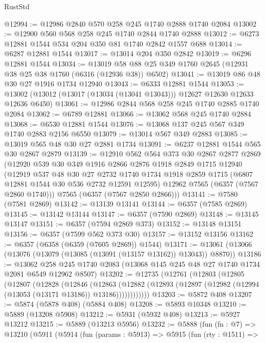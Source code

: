 \begin{lexlean}{RustStd}
\begin{coremodule}
@12994 := @12986 @2840 @570 @258 @245 @1740 @2888 @1740 @2084
@13002 := @12900 @560 @568 @258 @245 @1740 @2844 @1740 @2888
@13012 := @6273 @12881 @1544 @534 @204 @350 @81 @1740 @2842 @1557 @688
@13014 := @6287 @12881 @1544
@13017 := @13014 @204 @350 @2842
@13019 := @6296 @12881 @1544
@13034 := @13019 @58 @88 @25 @349 @1760 @2645 (@12931 @38 @25 @38 @1760 (@6316 (@12936 @38)) @6502)
@13041 := @13019 @86 @48 @30 @27 @1916 @1734 @12940
@13043 := @6333 @12881 @1544
@13053 := @13002 (@13012 (@13017 (@13034 (@13041 @13043))) @12627 @12630 @12633 @12636 @6450)
@13061 := @12986 @2844 @568 @258 @245 @1740 @2885 @1740 @2084
@13062 := @6789 @12881
@13066 := @13062 @568 @245 @1740 @2884
@13068 := @6530 @12881 @1544
@13076 := @13068 @137 @245 @567 @349 @1740 @2883 @2156 @6550
@13079 := @13014 @567 @349 @2883
@13085 := @13019 @565 @48 @30 @27 @2881 @1734
@13091 := @6237 @12881 @1544 @565 @30 @2867 @2879
@13139 := @12910
    @562
    @564
    @373
    @30
    @2867
    @2877
    @2869
    (@12920
      @539
      @30
      @349
      @1916
      @2866
      @2876
      @1918
      @2849
      @1715
      @12940
      (@12919
        @537
        @48
        @30
        @27
        @2732
        @1740
        @1734
        @1918
        @2859
        @1715
        (@6807 @12881 @1544 @30 @536 @2732 @12591 @12595)
        @12962
        @7565
        (@6357 (@7567 @2860 @1740)))
      @7565
      (@6357 (@7567 @2850 @2866)))
@13141 := @7580 (@7581 @2869)
@13142 := @13139 @13141
@13144 := @6357 (@7585 @2869)
@13145 := @13142 @13144
@13147 := @6357 (@7590 @2869)
@13148 := @13145 @13147
@13151 := @6357 (@7594 @2869 @373)
@13152 := @13148 @13151
@13156 := @6357 (@7599 @562 @373 @30)
@13157 := @13152 @13156
@13162 := @6357 (@6358 (@6359 (@7605 @2869)) @1544)
@13171 := @13061 (@13066 (@13076 (@13079 (@13085 (@13091 (@13157 @13162)) @13043)) @8870))
@13186 := @13062
    @258
    @245
    @1740
    @2083
    (@13068 @145 @245 @48 @27 @1740 @1734 @2081 @6549 @12962 @8507)
@13202 := @12735
    (@12761
      (@12803
        (@12805
          (@12807
            (@12828
              (@12846
                (@12863
                  (@12882
                    (@12893 (@12897 (@12982 (@12994 (@13053 (@13171 @13186)) @13186))))))))))))
@13203 := @5872 @408
@13207 := @5874 (@5878 @408) (@5884 @408)
@13208 := @5893 @10348
@13210 := @5889 (@13208 @5908)
@13212 := @5931 (@5932 @408)
@13213 := @5927 @13212
@13215 := @5889 (@13213 @5956)
@13232 := @5888
    (fun (fn : @7) =>
    @13210
      (@5911
        (@5914
          (fun (params : @5913) =>
          @5915
            (fun (rty : @1511) =>

\end{coremodule}
\end{lexlean}
